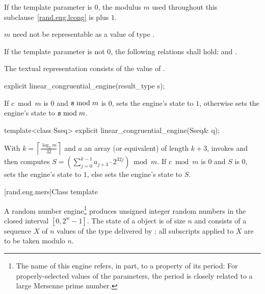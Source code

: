\pnum
If the template parameter
 is $0$,
the modulus $m$
used throughout this subclause~\ref{rand.eng.lcong}
is  plus $1$.
\begin{note}
 $m$ need not be representable
 as a value of type .
\end{note}

\pnum
If the template parameter
 is not $0$,
the following relations shall hold:
and
  .

\pnum
The textual representation%
consists of
the value of .

%
\begin{itemdecl}
explicit linear_congruential_engine(result_type s);
\end{itemdecl}

\begin{itemdescr}
\pnum
\effects
 If $c \bmod m$ is $0$ and $\texttt{s} \bmod m$ is $0$,
 sets the engine's state to $1$,
 otherwise sets the engine's state to $\texttt{s} \bmod m$.
\end{itemdescr}

%
\begin{itemdecl}
template<class Sseq> explicit linear_congruential_engine(Sseq& q);
\end{itemdecl}

\begin{itemdescr}
\pnum
\effects
 With
 $k = \left\lceil \frac{\log_2 m}{32} \right\rceil$
 and $a$ an array (or equivalent)
 of length $k + 3$,
 invokes 
 and then computes
 $S = \left(\sum_{j = 0}^{k - 1} a_{j + 3} \cdot 2^{32j} \right) \bmod m$.
 If $c \bmod m$ is $0$ and $S$ is $0$,
 sets the engine's state to $1$,
 else sets the engine's state
 to $S$.
\end{itemdescr}


[rand.eng.mers]{Class template }%
%

\pnum
A  random number
engine\footnote{The name of this engine refers, in part, to a property of its period:
 For properly-selected values of the parameters,
 the period is closely related to a large Mersenne prime number.}
produces unsigned integer random numbers
in the closed interval $[0,2^w-1]$.
The
%
%
state
of a  object 
is of size $n$
and consists of a sequence $X$
of $n$ values of the type delivered by ;
all subscripts applied to $X$ are to be taken modulo $n$.

